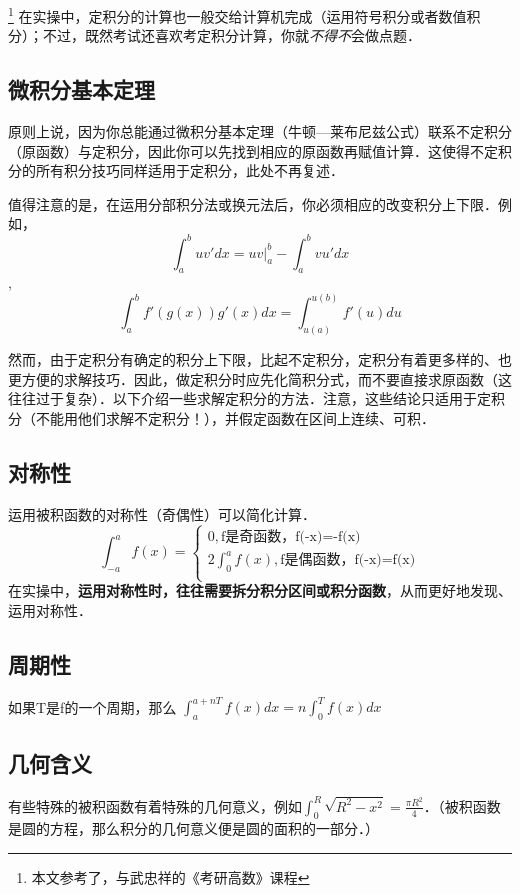 
\begin{issues}
\issueDraft
\end{issues}
\footnote{本文参考了\cite{同济高}，\cite{Thomas}与武忠祥的《考研高数》课程}
在实操中，定积分的计算也一般交给计算机完成（运用符号积分或者数值积分）；不过，既然考试还喜欢考定积分计算，你就\textsl{不得不}会做点题．

\subsection{微积分基本定理}
原则上说，因为你总能通过微积分基本定理（牛顿—莱布尼兹公式）联系不定积分（原函数）与定积分，因此你可以先找到相应的原函数再赋值计算．这使得不定积分的所有积分技巧同样适用于定积分，此处不再复述．

值得注意的是，在运用分部积分法或换元法后，你必须相应的改变积分上下限．例如，$$\int^b_a uv'dx = uv|^b_a-\int^b_a vu'dx$$, 
$$\int^b_a f'(g(x))g'(x)dx = \int ^{u(b)}_{u(a)} f'(u)du$$

然而，由于定积分有确定的积分上下限，比起不定积分，定积分有着更多样的、也更方便的求解技巧．因此，做定积分时应先化简积分式，而不要直接求原函数（这往往过于复杂）．以下介绍一些求解定积分的方法．注意，这些结论只适用于定积分（不能用他们求解不定积分！），并假定函数在区间上连续、可积．

\subsection{对称性}
运用被积函数的对称性（奇偶性）可以简化计算．
$$
\int ^a_{-a} f(x) = 
\left \{
\begin{aligned}
0,\text{f是奇函数，f(-x)=-f(x)}\\
2\int ^a_0 f(x),\text{f是偶函数，f(-x)=f(x)}\\
\end{aligned}
\right.
$$
在实操中，\textbf{运用对称性时，往往需要拆分积分区间或积分函数}，从而更好地发现、运用对称性．

\subsection{周期性}
如果T是f的一个周期，那么 $\int ^{a+nT}_{a} f(x)dx= n\int^{T}_0 f(x)dx$

\subsection{几何含义}
有些特殊的被积函数有着特殊的几何意义，例如$\int ^R_0 \sqrt{R^2-x^2}=\frac{\pi R^2}{4}$．（被积函数是圆的方程，那么积分的几何意义便是圆的面积的一部分．）

